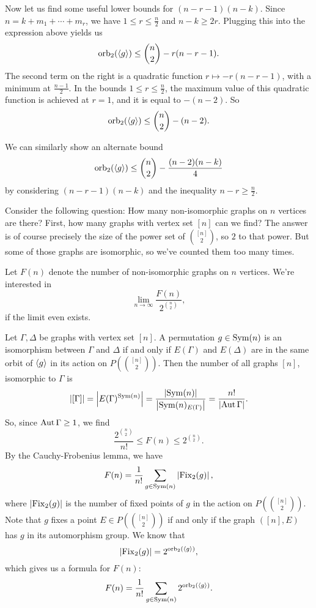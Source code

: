 Now let us find some useful lower bounds for $(n-r-1)(n-k)$.
Since $n = k + m_1 + \cdots + m_r$, we have $1 \le r \le \frac{n}{2}$ and $n-k
\ge 2r$.
Plugging this into the expression above yields us
\[
  \operatorname{orb}_2(\left< g \right>)
  \le \binom{n}{2} - r(n - r - 1).
\]
The second term on the right is a quadratic function $r \mapsto -r(n-r-1)$,
with a minimum at $\frac{n-1}{2}$.
In the bounds $1 \le r \le \frac{n}{2}$, the maximum value of this quadratic
function is achieved at $r = 1$, and it is equal to $-(n-2)$.
So
\[
  \operatorname{orb}_2(\left< g \right>)
  \le \binom{n}{2} - (n-2).
\]

We can similarly show an alternate bound
\[
  \operatorname{orb}_2(\left< g \right>)
  \le \binom{n}{2} - \frac{(n-2)(n-k)}{4}
\]
by considering $(n-r-1)(n-k)$ and the inequality $n-r \ge \frac{n}{2}$.


Consider the following question:
How many non-isomorphic graphs on $n$ vertices are there?
First, how many graphs with vertex set $[n]$ can we find?
The answer is of course precisely the size of the power set of $\binom{[n]}{2}$,
so $2$ to that power.
But some of those graphs are isomorphic, so we've counted them too many times.

Let $F(n)$ denote the number of non-isomorphic graphs on $n$ vertices.
We're interested in
\[
  \lim_{n \to \infty} \frac{F(n)}{2^{\binom{n}{2}}},
\]
if the limit even exists.

Let $\Gamma, \Delta$ be graphs with vertex set $[n]$.
A permutation $g \in \operatorname{Sym}(n)$ is an isomorphism between $\Gamma$ and $\Delta$ if
and only if $E(\Gamma)$ and $E(\Delta)$ are in the same orbit of $\left< g \right>$ in its
action on $P(\binom{[n]}{2})$.
Then the number of all graphs $[n]$, isomorphic to $\Gamma$ is
\[
  \left| [\Gamma] \right| = \left| E(\Gamma)^{\operatorname{Sym}(n)} \right|
  = \frac{\left| \operatorname{Sym}(n) \right|}{\left| \operatorname{Sym}(n)_{E(\Gamma)} \right|}
  = \frac{n!}{\left| \operatorname{Aut} \Gamma \right|}.
\]
So, since $\operatorname{Aut} \Gamma \ge 1$, we find
\[
  \frac{2^{\binom{n}{2}}}{n!} \le F(n) \le 2^{\binom{n}{2}}.
\]
By the Cauchy-Frobenius lemma, we have
\[
  F(n) = \frac{1}{n!} \sum_{g \in \operatorname{Sym}(n)} \left| \operatorname{Fix}_2(g) \right|,
\]
where $\left| \operatorname{Fix}_2(g) \right|$ is the number of fixed points of $g$ in the action on
$P(\binom{[n]}{2})$.
Note that $g$ fixes a point $E \in P(\binom{[n]}{2})$ if and only if the graph
$([n], E)$ has $g$ in its automorphism group.
We know that
\[
  \left| \operatorname{Fix}_2(g) \right| = 2^{\operatorname{orb}_2(\left< g \right>)},
\]
which gives us a formula for $F(n)$:
\[
  F(n) = \frac{1}{n!} \sum_{g \in \operatorname{Sym}(n)} 2^{\operatorname{orb}_2(\left< g \right>)}.
\]

